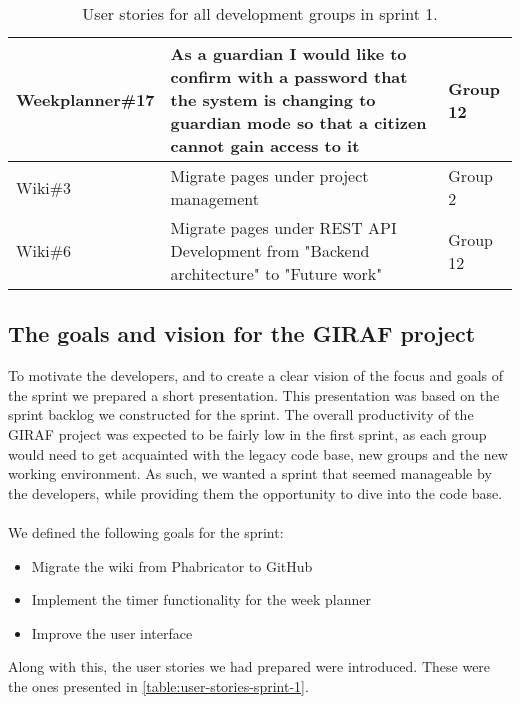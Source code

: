 \begin{table}[H]
\begin{tabular}{|p{2.8cm}|p{8cm}|p{2cm}|}
    Weekplanner\#17 & As a guardian I would like to confirm with a password that the system is changing to guardian mode so that a citizen cannot gain access to it                            & Group 12             \\ \hline
    Wiki\#3         & Migrate pages under project management                                                                                                                                   & Group 2              \\ \hline
    Wiki\#6         & Migrate pages under REST API Development from "Backend architecture" to "Future work"                                                                                    & Group 12             \\ \hline
    \end{tabular}
    \caption{User stories for all development groups in sprint 1.}\label{table:user-stories-sprint-1-updated}
\end{table}


\subsection{The goals and vision for the GIRAF project}
To motivate the developers, and to create a clear vision of the focus and goals of the sprint we prepared a short presentation.
This presentation was based on the sprint backlog we constructed for the sprint.
The overall productivity of the GIRAF project was expected to be fairly low in the first sprint, as each group would need to get acquainted with the legacy code base, new groups and the new working environment.
As such, we wanted a sprint that seemed manageable by the developers, while providing them the opportunity to dive into the code base.
\\\\
We defined the following goals for the sprint:
\begin{itemize}
    \item Migrate the wiki from Phabricator to GitHub
    \item Implement the timer functionality for the week planner
    \item Improve the user interface
\end{itemize}
Along with this, the user stories we had prepared were introduced. These were the ones presented in \autoref{table:user-stories-sprint-1}.

